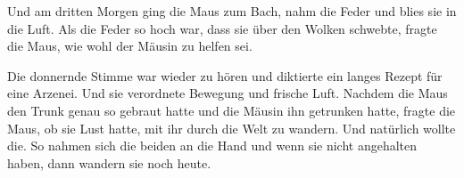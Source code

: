 Und am dritten Morgen ging die Maus zum Bach, nahm die Feder und blies sie in die Luft. Als die Feder so hoch war, dass sie über den Wolken schwebte, fragte die Maus, wie wohl der Mäusin zu helfen sei.

Die donnernde Stimme war wieder zu hören und diktierte ein langes Rezept für eine Arzenei. Und sie verordnete Bewegung und frische Luft. Nachdem die Maus den Trunk genau so gebraut hatte und die Mäusin ihn getrunken hatte, fragte die Maus, ob sie Lust hatte, mit ihr durch die Welt zu wandern. Und natürlich wollte die. So nahmen sich die beiden an die Hand und wenn sie nicht angehalten haben, dann wandern sie noch heute. \hfill {\color{DeepPink}\decofourleft}
